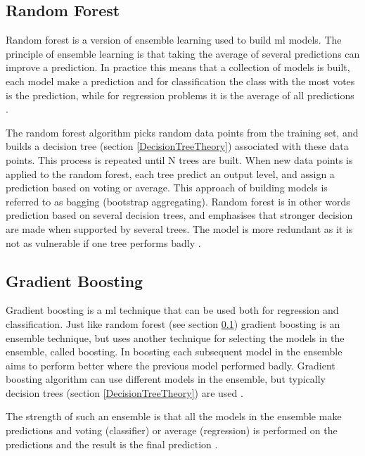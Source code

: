 \documentclass[english, a4paper]{report}
\begin{document}
{{        \subsection{Random Forest}\label{RandomForestTheory}
        {
            Random forest is a version of ensemble learning used to build \gls{ml} models. The principle of ensemble learning is that taking the average of several predictions can improve a prediction. In practice this means that a collection of models is built, each model make a prediction and for classification the class with the most votes is the prediction, while for regression problems it is the average of all predictions \cite{pythonML}.
            \par
            The random forest algorithm picks random data points from the training set, and builds a decision tree (section \ref{DecisionTreeTheory}) associated with these data points.  This process is repeated until N trees are built. When new data points is applied to the random forest, each tree predict an output level, and assign a prediction based on voting or average. This approach of building models is referred to as bagging (bootstrap aggregating). Random forest is in other words prediction based on several decision trees, and emphasises that stronger decision are made when supported by several trees. The model is more redundant as it is not as vulnerable if one tree performs badly \cite{mlInPython}.
        }
        
        \subsection{Gradient Boosting}\label{GradientBoostingTheory}
        {
            Gradient boosting is a \gls{ml} technique that can be used both for regression and classification. Just like random forest (see section \ref{RandomForestTheory}) gradient boosting is an ensemble technique, but uses another technique for selecting the models in the ensemble, called boosting. In boosting each subsequent model in the ensemble aims to perform better where the previous model performed badly. Gradient boosting algorithm can use different models in the ensemble, but typically decision trees (section \ref{DecisionTreeTheory}) are used \cite{mlInPython}.
            \par
            The strength of such an ensemble is that all the models in the ensemble make predictions and voting (classifier) or average (regression) is performed on the predictions and the result is the final prediction \cite{mlInPython}.  
        }
        
}}
\end{document}
